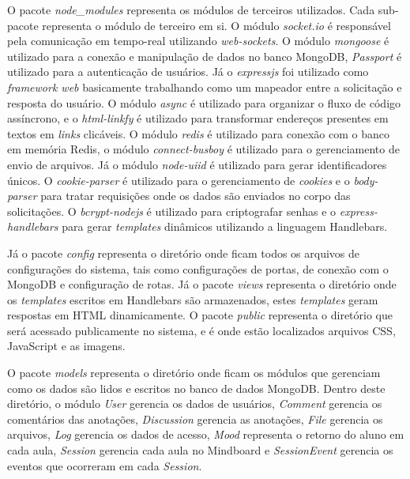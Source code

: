 O pacote \emph{node\_modules} representa os módulos de terceiros utilizados. Cada sub-pacote representa o módulo de terceiro em si. O módulo \emph{socket.io} é responsável pela comunicação em tempo-real utilizando \emph{web-sockets}. O módulo \emph{mongoose} é utilizado para a conexão e manipulação de dados no banco MongoDB, \emph{Passport} é utilizado para a autenticação de usuários. Já o \emph{expressjs} foi utilizado como \emph{framework web} basicamente trabalhando como um mapeador entre a solicitação e resposta do usuário. O módulo \emph{async} é utilizado para organizar o fluxo de código assíncrono, e o \emph{html-linkfy} é utilizado para transformar endereços presentes em textos em \emph{links} clicáveis. O módulo \emph{redis} é utilizado para conexão com o banco em memória Redis, o módulo \emph{connect-busboy} é utilizado para o gerenciamento de envio de arquivos. Já o módulo \emph{node-uiid} é utilizado para gerar identificadores únicos. O \emph{cookie-parser} é utilizado para o gerenciamento de \emph{cookies} e o \emph{body-parser} para tratar requisições onde os dados são enviados no corpo das solicitações. O \emph{bcrypt-nodejs} é utilizado para criptografar senhas e o \emph{express-handlebars} para gerar \emph{templates} dinâmicos utilizando a linguagem Handlebars. 


Já o pacote \emph{config} representa o diretório onde ficam todos os arquivos de configurações do sistema, tais como configurações de portas, de conexão com o MongoDB e configuração de rotas. Já o pacote \emph{views} representa o diretório onde os \emph{templates} escritos em Handlebars são armazenados, estes \emph{templates} geram respostas em HTML dinamicamente. O pacote \emph{public} representa o diretório que será acessado publicamente no sistema, e é onde estão localizados arquivos CSS, JavaScript e as imagens.

O pacote \emph{models} representa o diretório onde ficam os módulos que gerenciam como os dados são lidos e escritos no banco de dados MongoDB. Dentro deste diretório, o módulo \emph{User} gerencia os dados de usuários, \emph{Comment} gerencia os comentários das anotações, \emph{Discussion} gerencia as anotações, \emph{File} gerencia os arquivos, \emph{Log} gerencia os dados de acesso, \emph{Mood} representa o retorno do aluno em cada aula, \emph{Session} gerencia cada aula no Mindboard e \emph{SessionEvent} gerencia os eventos que ocorreram em cada \emph{Session}.

